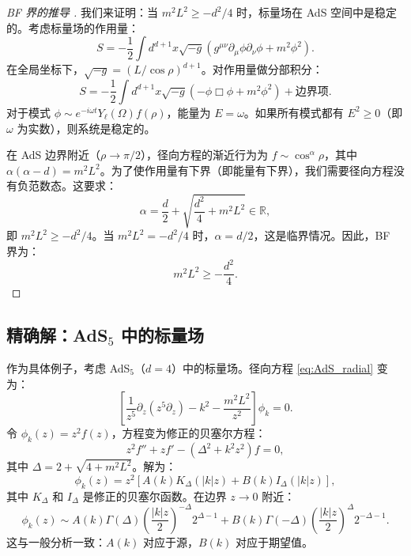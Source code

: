 \begin{proof}[BF 界的推导 \cite{Aharony1999}]
我们来证明：当 $m^2 L^2 \geq -d^2/4$ 时，标量场在 AdS 空间中是稳定的。考虑标量场的作用量：
\begin{equation}
    S = -\frac{1}{2} \int d^{d+1}x \sqrt{-g} \left( g^{\mu\nu} \partial_\mu \phi \partial_\nu \phi + m^2 \phi^2 \right).
\end{equation}
在全局坐标下，$\sqrt{-g} = (L/\cos\rho)^{d+1}$。对作用量做分部积分：
\begin{equation}
    S = -\frac{1}{2} \int d^{d+1}x \sqrt{-g} \left( -\phi \Box \phi + m^2 \phi^2 \right) + \text{边界项}.
\end{equation}
对于模式 $\phi \sim e^{-i\omega t} Y_{\ell}(\Omega) f(\rho)$，能量为 $E = \omega$。如果所有模式都有 $E^2 \geq 0$（即 $\omega$ 为实数），则系统是稳定的。

在 AdS 边界附近（$\rho \to \pi/2$），径向方程的渐近行为为 $f \sim \cos^\alpha\rho$，其中 $\alpha(\alpha-d) = m^2 L^2$。为了使作用量有下界（即能量有下界），我们需要径向方程没有负范数态。这要求：
\begin{equation}
    \alpha = \frac{d}{2} + \sqrt{\frac{d^2}{4} + m^2 L^2} \in \mathbb{R},
\end{equation}
即 $m^2 L^2 \geq -d^2/4$。当 $m^2 L^2 = -d^2/4$ 时，$\alpha = d/2$，这是临界情况。因此，BF 界为：
\begin{equation}
    m^2 L^2 \geq -\frac{d^2}{4}.
\end{equation}
\end{proof}

\subsection{精确解：AdS$_{5}$ 中的标量场}

作为具体例子，考虑 AdS$_5$（$d=4$）中的标量场。径向方程 \eqref{eq:AdS_radial} 变为：
\begin{equation}
    \left[\frac{1}{z^5} \partial_z \left(z^5 \partial_z\right) - k^2 - \frac{m^2 L^2}{z^2}\right] \phi_k = 0.
\end{equation}
令 $\phi_k(z) = z^2 f(z)$，方程变为修正的贝塞尔方程：
\begin{equation}
    z^2 f'' + z f' - \left(\Delta^2 + k^2 z^2\right) f = 0,
\end{equation}
其中 $\Delta = 2 + \sqrt{4 + m^2 L^2}$。解为：
\begin{equation}
    \phi_k(z) = z^2 \left[ A(k) K_\Delta(|k|z) + B(k) I_\Delta(|k|z) \right],
\end{equation}
其中 $K_\Delta$ 和 $I_\Delta$ 是修正的贝塞尔函数。在边界 $z \to 0$ 附近：
\begin{equation}
    \phi_k(z) \sim A(k) \Gamma(\Delta) \left(\frac{|k|z}{2}\right)^{-\Delta} 2^{\Delta-1} + B(k) \Gamma(-\Delta) \left(\frac{|k|z}{2}\right)^\Delta 2^{-\Delta-1}.
\end{equation}
这与一般分析一致：$A(k)$ 对应于源，$B(k)$ 对应于期望值。

